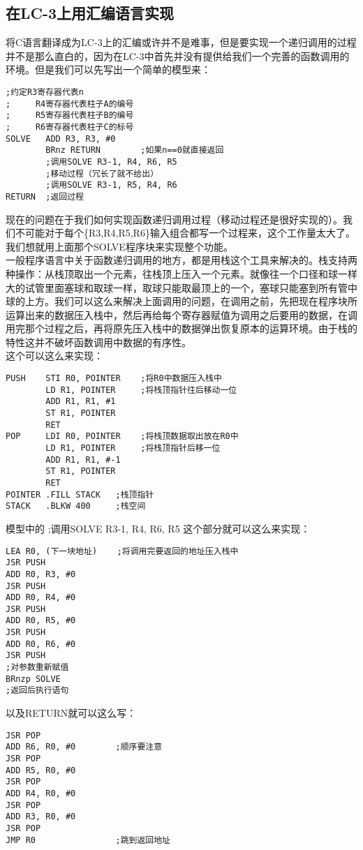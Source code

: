 \documentclass{article}
\begin{document}
\subsection{在LC-3上用汇编语言实现}
将C语言翻译成为LC-3上的汇编或许并不是难事，但是要实现一个递归调用的过程并不是那么直白的，因为在LC-3中首先并没有提供给我们一个完善的函数调用的环境。但是我们可以先写出一个简单的模型来：
\begin{verbatim}
;约定R3寄存器代表n
;     R4寄存器代表柱子A的编号
;     R5寄存器代表柱子B的编号
;     R6寄存器代表柱子C的标号
SOLVE   ADD R3, R3, #0
        BRnz RETURN        ;如果n==0就直接返回
        ;调用SOLVE R3-1, R4, R6, R5
        ;移动过程（冗长了就不给出）
        ;调用SOLVE R3-1, R5, R4, R6
RETURN  ;返回过程
\end{verbatim}
\indent 现在的问题在于我们如何实现函数递归调用过程（移动过程还是很好实现的）。我们不可能对于每个\{R3,R4,R5,R6\}输入组合都写一个过程来，这个工作量太大了。我们想就用上面那个SOLVE程序块来实现整个功能。\\
\indent 一般程序语言中关于函数递归调用的地方，都是用栈这个工具来解决的。栈支持两种操作：从栈顶取出一个元素，往栈顶上压入一个元素。就像往一个口径和球一样大的试管里面塞球和取球一样，取球只能取最顶上的一个，塞球只能塞到所有管中球的上方。我们可以这么来解决上面调用的问题，在调用之前，先把现在程序块所运算出来的数据压入栈中，然后再给每个寄存器赋值为调用之后要用的数据，在调用完那个过程之后，再将原先压入栈中的数据弹出恢复原本的运算环境。由于栈的特性这并不破坏函数调用中数据的有序性。\\
\indent 这个可以这么来实现：
\begin{verbatim}
PUSH    STI R0, POINTER    ;将R0中数据压入栈中
        LD R1, POINTER     ;将栈顶指针往后移动一位
        ADD R1, R1, #1
        ST R1, POINTER
        RET
POP     LDI R0, POINTER    ;将栈顶数据取出放在R0中
        LD R1, POINTER     ;将栈顶指针后移一位
        ADD R1, R1, #-1
        ST R1, POINTER
        RET
POINTER .FILL STACK   ;栈顶指针
STACK   .BLKW 400     ;栈空间
\end{verbatim}
\indent 模型中的 ;调用SOLVE R3-1, R4, R6, R5 这个部分就可以这么来实现：
\begin{verbatim}
LEA R0, (下一块地址)    ;将调用完要返回的地址压入栈中
JSR PUSH
ADD R0, R3, #0
JSR PUSH
ADD R0, R4, #0
JSR PUSH
ADD R0, R5, #0
JSR PUSH
ADD R0, R6, #0
JSR PUSH
;对参数重新赋值
BRnzp SOLVE
;返回后执行语句
\end{verbatim}
\indent 以及RETURN就可以这么写：
\begin{verbatim}
JSR POP
ADD R6, R0, #0        ;顺序要注意
JSR POP
ADD R5, R0, #0
JSR POP
ADD R4, R0, #0
JSR POP
ADD R3, R0, #0
JSR POP
JMP R0                ;跳到返回地址
\end{verbatim}
\end{document}
